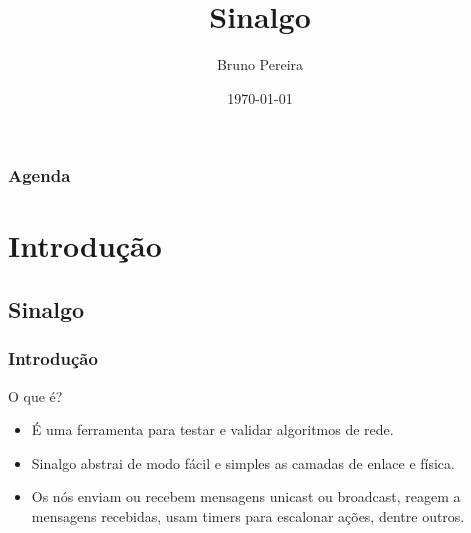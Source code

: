 \documentclass{beamer}
\title[Sinalgo]{Sinalgo} %
\author{Bruno Pereira} %
\institute[UFMG] %
{
Universidade Federal de Minas Gerais \\ %
\medskip
\textit{bruno.ps@dcc.ufmg.com} %
}
\date{\tiny\today} %
\begin{document}
\begin{frame}
\titlepage %
\end{frame}

\begin{frame}
\frametitle{Agenda} %
\tableofcontents %
\end{frame}


\section{Introdução} %

\subsection{Sinalgo} %

\begin{frame}\frametitle{Introdução}

\begin{block}{O que é?}
\begin{itemize}
	\item É uma ferramenta para testar e validar algoritmos de rede.
	\item Sinalgo abstrai de modo fácil e simples as camadas de enlace e física.
	\item Os nós enviam ou recebem mensagens unicast ou broadcast,
reagem a mensagens recebidas, usam timers para escalonar ações, dentre outros.
\end{itemize}
\end{block}

\end{frame}
\end{document}
